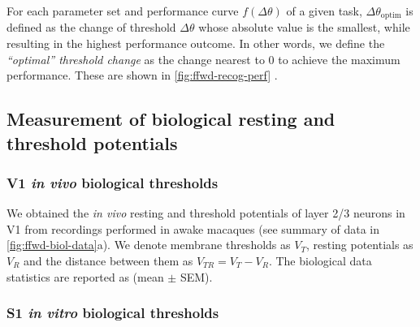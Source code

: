 For each parameter set and performance curve $f(\Delta \theta)$ of a given task,
    $\Delta \theta_{\text{optim}}$ is defined as the change of threshold $\Delta \theta$
        whose absolute value is the smallest,
        while resulting in the highest performance outcome.
    In other words, we define the \textit{``optimal'' threshold change}
        as the change nearest to 0 to achieve the maximum performance.
    These are shown in \autoref{fig:ffwd-recog-perf}
        .

\subsection{Measurement of biological resting and threshold potentials}

\subsubsection*{V1 \textit{in vivo} biological thresholds}

We obtained the \textit{in vivo} resting and threshold potentials
        of layer 2/3 neurons in V1 from recordings performed in awake macaques \citep{Li2020-ej}
        (see summary of data in \autoref{fig:ffwd-biol-data}a).
    We denote membrane thresholds as $V_T$,
        resting potentials as $V_R$
        and the distance between them as $V_{TR} = V_T - V_R$.
    The biological data statistics are reported as (mean $\pm$ SEM).

\subsubsection*{S1 \textit{in vitro} biological thresholds}

